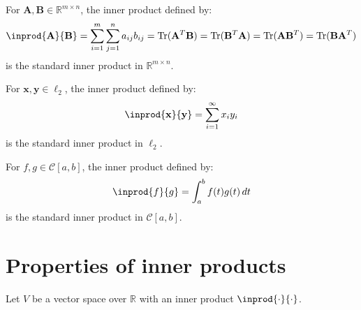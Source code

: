 \documentclass{huhtakm-template-book-v2}
\DeclareMathOperator{\Tr}{Tr}
\begin{document}
    \begin{eg}
        For $\mathbf{A}, \mathbf{B} \in \mathbb{R}^{m \times n}$, the inner product defined by:
        \begin{equation*}
            \inprod{\mathbf{A}}{\mathbf{B}} = \sum_{i=1}^{m}\sum_{j=1}^{n}a_{ij}b_{ij} = \Tr(\mathbf{A}^{T}\mathbf{B}) = \Tr(\mathbf{B}^{T}\mathbf{A}) = \Tr(\mathbf{A}\mathbf{B}^{T}) = \Tr(\mathbf{B}\mathbf{A}^{T})
        \end{equation*}
        is the standard inner product in $\mathbb{R}^{m \times n}$.
    \end{eg}
    \begin{eg}
        For $\mathbf{x}, \mathbf{y} \in \ell_{2}$, the inner product defined by:
        \begin{equation*}
            \inprod{\mathbf{x}}{\mathbf{y}} = \sum_{i=1}^{\infty}x_{i}y_{i}
        \end{equation*}
        is the standard inner product in $\ell_{2}$.
    \end{eg}
    \begin{eg}
        For $f, g \in \mathcal{C}[a, b]$, the inner product defined by:
        \begin{equation*}
            \inprod{f}{g} = \int_{a}^{b}f(t)g(t)\,dt
        \end{equation*}
        is the standard inner product in $\mathcal{C}[a, b]$.
    \end{eg}

\section{Properties of inner products}
    Let $V$ be a vector space over $\mathbb{R}$ with an inner product $\inprod{\cdot}{\cdot}$.
\end{document}
